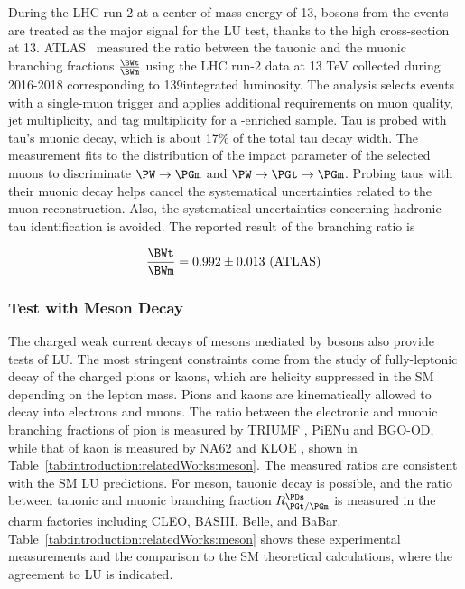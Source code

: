 During the LHC run-2 at a center-of-mass energy of 13\TeV, \PW bosons from the \ttbar events are treated as the major signal for the LU test, thanks to the high \ttbar cross-section at 13\TeV. ATLAS~\cite{Aad:2020ayz} measured the ratio between the tauonic and the muonic branching fractions $\frac{ \BWt }{ \BWm} $ using the LHC run-2 data at 13 TeV collected during 2016-2018 corresponding to 139\fbinv integrated luminosity. The analysis selects \ttbar events with a single-muon trigger and applies additional requirements on muon quality, jet multiplicity, and \PQb tag multiplicity for a \ttbar-enriched sample. Tau is probed with tau's muonic decay, which is about 17\% of the total tau decay width. The measurement fits to the distribution of the impact parameter of the selected muons to discriminate $\PW \to \PGm$ and $\PW \to \PGt \to \PGm$. Probing taus with their muonic decay helps cancel the systematical uncertainties related to the muon reconstruction. Also, the systematical uncertainties concerning hadronic tau identification is avoided. The reported result of the branching ratio is

$$ \frac{ \BWt }{ \BWm} = 0.992 \pm 0.013 \text{ (ATLAS) }$$





\subsubsection{Test with Meson Decay}




The charged weak current decays of mesons mediated by \PW bosons also provide tests of LU.  The most stringent constraints come from the study of fully-leptonic decay of the charged pions or kaons, which are helicity suppressed in the SM depending on the lepton mass. Pions and kaons are kinematically allowed to decay into electrons and muons. The ratio between the electronic and muonic branching fractions of pion is measured by TRIUMF \cite{Numao:1992ve, Britton:1992pg}, PiENu \cite{Aguilar-Arevalo:2015cdf} and BGO-OD\cite{Czapek:1993kc},  while that of kaon is measured by NA62 \cite{Lazzeroni:2012cx} and KLOE \cite{Ambrosino:2009aa}, shown in Table~\ref{tab:introduction:relatedWorks:meson}. The measured ratios are consistent with the SM LU predictions. For \PDs meson, tauonic decay is possible, and the ratio between tauonic and muonic branching fraction $R^\PDs_{\PGt/\PGm}$ is measured in the charm factories including CLEO, BASIII, Belle, and BaBar. Table~\ref{tab:introduction:relatedWorks:meson} shows these experimental measurements and the comparison to the SM theoretical calculations, where the agreement to LU is indicated. 


